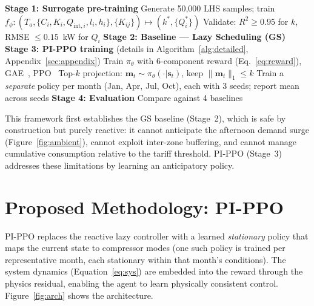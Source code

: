 \documentclass[12pt,a4paper]{article}
\begin{document}
\begin{algorithm}[H]
\SetAlgoLined
\caption{PI-PPO Framework}
\label{alg:framework}
\textbf{Stage 1: Surrogate pre-training}\;
\Indp Generate 50{,}000 LHS samples; train $f_\phi: (T_a, \{C_i, K_i, Q_{\text{int},i}, l_i, h_i\}, \{K_{ij}\}) \mapsto (k^*, \{Q_i^*\})$\;
Validate: $R^2 \geq 0.95$ for $k$, RMSE $\leq 0.15$~kW for $Q_i$\;\Indm
\textbf{Stage 2: Baseline --- Lazy Scheduling (GS)}\;
\Indp {}\Indm
\textbf{Stage 3: PI-PPO training} (details in Algorithm~\ref{alg:detailed}, Appendix~\ref{sec:appendix})\;
\Indp Train $\pi_\theta$ with 6-component reward (Eq.~\eqref{eq:reward}), GAE~\cite{ref38}, PPO~\cite{ref32}\;
Top-$k$ projection: $\mathbf{m}_t \sim \pi_\theta(\cdot|\mathbf{s}_t)$, keep $\|\mathbf{m}_t\|_1 \leq k$\;
Train a \emph{separate} policy per month (Jan, Apr, Jul, Oct), each with 3 seeds; report mean across seeds\;\Indm
\textbf{Stage 4: Evaluation}\;
\Indp {}
Compare against 4 baselines\;\Indm
\end{algorithm}

This framework first establishes the GS baseline (Stage~2), which is safe by construction but purely reactive: it cannot anticipate the afternoon demand surge (Figure~\ref{fig:ambient}), cannot exploit inter-zone buffering, and cannot manage cumulative consumption relative to the tariff threshold. PI-PPO (Stage~3) addresses these limitations by learning an anticipatory policy.

\section{Proposed Methodology: PI-PPO}
\label{sec:method}

PI-PPO replaces the reactive lazy controller with a learned \textit{stationary} policy that maps the current state to compressor modes (one such policy is trained per representative month, each stationary within that month's conditions). The system dynamics (Equation~\eqref{eq:sys}) are embedded into the reward through the physics residual, enabling the agent to learn physically consistent control. Figure~\ref{fig:arch} shows the architecture.
\end{document}
